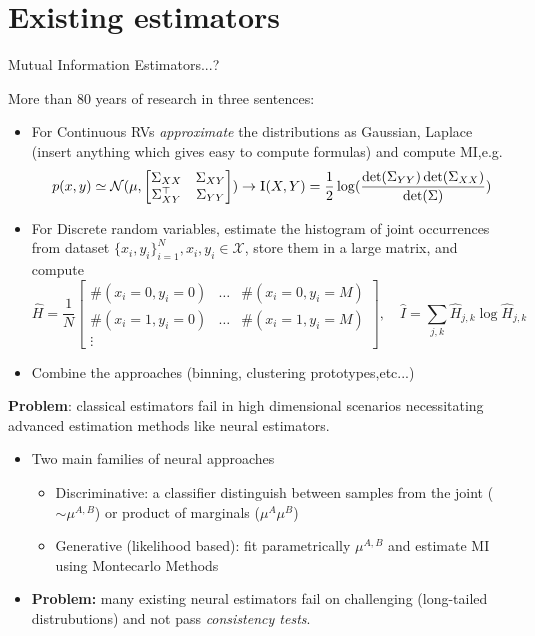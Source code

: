 \section{Existing estimators}
\begin{frame}[allowframebreaks]{Mutual Information Estimators...?}

More than 80 years of research in three sentences:
\begin{itemize}
    \item For Continuous RVs \textit{approximate} the distributions as Gaussian, Laplace (insert anything which gives easy to compute formulas) and compute MI,e.g.
    {\small \[p(x,y)\simeq \mathcal{N}(\mu,\begin{bmatrix}
        \Sigma_{XX} &\Sigma_{XY}\\\Sigma_{XY}^\top &\Sigma_{YY}
    \end{bmatrix}) \rightarrow \textsc{I}(X,Y)=\frac{1}{2}\log(\frac{\det(\Sigma_{YY})\det(\Sigma_{XX})}{\det(\Sigma)})\]}
    \item For Discrete random variables, estimate the histogram of joint occurrences from dataset $\{x_i,y_i\}_{i=1}^N, x_i,y_i\in \mathcal{X}$, store them in a large matrix, and compute
   {\small \[ \hat{H}=\frac{1}{N}\begin{bmatrix} \#(x_i=0,y_i=0) &\dots & \#(x_i=0,y_i=M) \\ \#(x_i=1,y_i=0) &\dots & \#(x_i=1,y_i=M)\\ \vdots \end{bmatrix}, \quad \hat{I}=\sum_{j,k}\hat{H}_{j,k}\log \hat{H}_{j,k}\]}
    \item Combine the approaches (binning, clustering prototypes,etc...)
\end{itemize}

\framebreak

\textbf{Problem}: classical estimators fail in high dimensional scenarios necessitating advanced estimation methods like neural estimators.

\begin{itemize}


\item Two main families of neural approaches\begin{itemize}
    \item Discriminative: a classifier distinguish between samples from the joint ($\sim \mu^{A,B}$) or product of marginals ($\mu^A \mu^B$)
    \item Generative (likelihood based): fit parametrically $\mu^{A,B}$ and estimate MI using Montecarlo Methods
\end{itemize}
\item \textbf{Problem:} many existing neural estimators fail on challenging (long-tailed distrubutions) and not pass \textit{consistency tests}.
    \end{itemize}


\end{frame}
